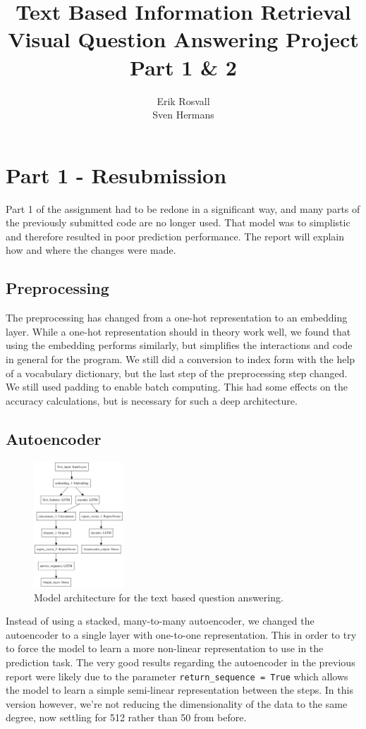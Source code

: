 \documentclass[10pt,a4paper]{report}
\author{Erik Rosvall \\ Sven Hermans}
\title{Text Based Information Retrieval \\ Visual Question Answering Project \\ Part 1 \& 2}
\begin{document}
	\maketitle
	\section*{Part 1 - Resubmission}
		Part 1 of the assignment had to be redone in a significant way, and many parts of the previously submitted code are no longer used. That model was to simplistic and therefore resulted in poor prediction performance. The report will explain how and where the changes were made.
	\subsection*{Preprocessing}
		The preprocessing has changed from a one-hot representation to an embedding layer. While a one-hot representation should in theory work well, we found that using the embedding performs similarly, but simplifies the interactions and code in general for the program. We still did a conversion to index form with the help of a vocabulary dictionary, but the last step of the preprocessing step changed. We still used padding to enable batch computing. This had some effects on the accuracy calculations, but is necessary for such a deep architecture.
	\subsection*{Autoencoder}
		\begin{figure}
		\begin{center}
			\includegraphics[width=0.3\textwidth]{text_classifier_w_autoencoder.png}
		\end{center}
		\caption{Model architecture for the text based question answering. \label{text_classifier_w_autoencoder}}
	\end{figure}
	Instead of using a stacked, many-to-many autoencoder, we changed the autoencoder to a single layer with one-to-one representation. This in order to try to force the model to learn a more non-linear representation to use in the prediction task. The very good results regarding the autoencoder in the previous report were likely due to the parameter \texttt{return\_sequence = True} which allows the model to learn a simple semi-linear representation between the steps. In this version however, we're not reducing the dimensionality of the data to the same degree, now settling for 512 rather than 50 from before.
\end{document}
